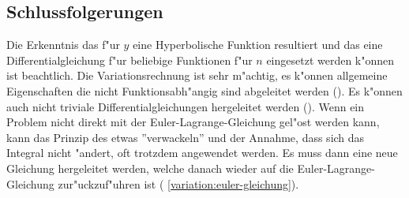  \subsection{Schlussfolgerungen}
Die Erkenntnis das f"ur $y$ eine Hyperbolische Funktion resultiert
und das eine Differentialgleichung f"ur beliebige Funktionen f"ur $n$
eingesetzt werden k"onnen ist beachtlich. Die Variationsrechnung
ist sehr m"achtig, es k"onnen allgemeine Eigenschaften die nicht
Funktionsabh"angig sind abgeleitet werden (). Es
k"onnen auch nicht triviale Differentialgleichungen hergeleitet werden
(). Wenn ein Problem nicht direkt mit der
Euler-Lagrange-Gleichung gel"ost werden kann, kann das Prinzip des etwas
''verwackeln'' und der Annahme, dass sich das Integral nicht "andert, oft
trotzdem angewendet werden. Es muss dann eine neue Gleichung hergeleitet
werden, welche danach wieder auf die Euler-Lagrange-Gleichung
zur"uckzuf"uhren ist (
\eqref{variation:euler-gleichung}).
